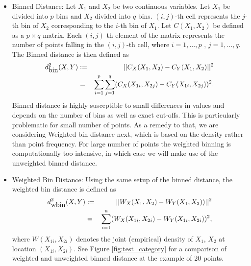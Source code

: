 \documentclass[12]{article}
\newcommand{\red}[1]{{\color{red} #1}}
\begin{document}
\begin{itemize}
\item Binned Distance:
Let $X_1$ and $X_2$ be two continuous variables. Let $X_1$ be divided into $p$ bins and $X_2$ divided into $q$ bins. $(i,j)$-th cell represents the $j$-th bin of $X_2$ corresponding to the $i$-th bin of $X_1$. Let $C(X_1,X_2)$ be defined as a $p \times q$ matrix. Each $(i,j)$-th element of the matrix represents the number of points falling in the $(i,j)$-th cell, where $i = 1, \dots, p$ , $j = 1, \dots, q$.
The Binned distance is then defined as
\begin{eqnarray*}
d_{\hbox{bin}}^2 (X, Y) &:=& ||C_X(X_1, X_2) - C_Y(X_1,X_2)||^2 \\ &=& \sum_{i=1}^p \sum_{j=1}^q (C_X(X_{1i},X_{2j}) - C_Y(X_{1i},X_{2j}))^2.
\end{eqnarray*}
Binned distance is highly susceptible to small differences in values and depends on the number of bins as well as exact cut-offs. This is particularly problematic for small number of points. As a remedy to that, we are considering Weighted bin distance next, which is based on the density rather than point frequency. For large number of points the weighted binning is computationally too intensive, in which case we will make use of the unweighted binned distance.


\item Weighted Bin Distance: Using the same setup of the binned distance, the weighted bin distance is defined as 
\begin{eqnarray*}
d_{\hbox{wbin}}^2(X, Y) &:=&||W_X(X_1,X_2) - W_Y(X_1,X_2))||^2 \\ &=& \sum_{i=1}^n (W_X(X_{1i},X_{2i}) - W_Y(X_{1i},X_{2i}))^2 , 
\end{eqnarray*}
where $W(X_{1i},X_{2i})$ denotes the joint (empirical) density of $X_1$, $X_2$ at location $(X_{1i}, X_{2i})$. See Figure \ref{fig:test_category} for a comparison of weighted and unweighted binned distance at the example of 20  points.


\end{itemize}
\end{document}
